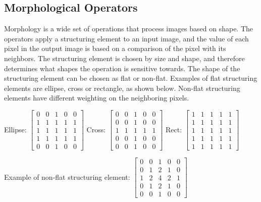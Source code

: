 \subsection{Morphological Operators}

Morphology is a wide set of operations that process images based on shape. The operators apply a structuring element to an input image, and the value of each pixel in the output image is based on a comparison of the pixel with its neighbors. The structuring element is chosen by size and shape, and therefore determines what shapes the operation is sensitive towards. 
The shape of the structuring element can be chosen as flat or non-flat. Examples of flat structuring elements are ellipse, cross or rectangle, as shown below. Non-flat structuring elements have different weighting on the neighboring pixels. 

\noindent Ellipse: 
$\begin{bmatrix}
    0 & 0 & 1 & 0 & 0 \\
    1 & 1 & 1 & 1 & 1 \\
    1 & 1 & 1 & 1 & 1 \\
    1 & 1 & 1 & 1 & 1 \\
    0 & 0 & 1 & 0 & 0
\end{bmatrix}$ 
Cross: 
$\begin{bmatrix}
    0 & 0 & 1 & 0 & 0 \\
    0 & 0 & 1 & 0 & 0 \\
    1 & 1 & 1 & 1 & 1 \\
    0 & 0 & 1 & 0 & 0 \\
    0 & 0 & 1 & 0 & 0 
\end{bmatrix}$
Rect: 
$\begin{bmatrix}
    1 & 1 & 1 & 1 & 1 \\
    1 & 1 & 1 & 1 & 1 \\
    1 & 1 & 1 & 1 & 1 \\
    1 & 1 & 1 & 1 & 1 \\
    1 & 1 & 1 & 1 & 1
\end{bmatrix}$

Example of non-flat structuring element:
$\begin{bmatrix}
    0 & 0 & 1 & 0 & 0 \\
    0 & 1 & 2 & 1 & 0 \\
    1 & 2 & 4 & 2 & 1 \\
    0 & 1 & 2 & 1 & 0 \\
    0 & 0 & 1 & 0 & 0
\end{bmatrix}$ 

